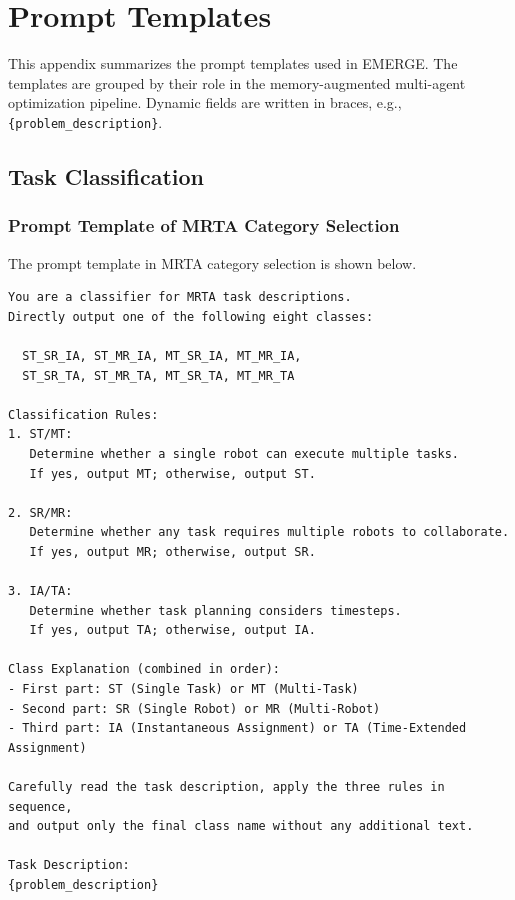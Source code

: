\documentclass[letterpaper,onecolumn,12pt]{IEEEtran}
\begin{document}
\section{Prompt Templates}


This appendix summarizes the prompt templates used in EMERGE. The templates are
grouped by their role in the memory-augmented multi-agent optimization pipeline.
Dynamic fields are written in braces, e.g., \texttt{\{problem\_description\}}.


\subsection{Task Classification}

\subsubsection{Prompt Template of MRTA Category Selection}
\label{app:prompt_selector}

The prompt template in MRTA category selection is shown below.
\begin{lstlisting}[style=promptstyle]
You are a classifier for MRTA task descriptions.
Directly output one of the following eight classes:

  ST_SR_IA, ST_MR_IA, MT_SR_IA, MT_MR_IA,
  ST_SR_TA, ST_MR_TA, MT_SR_TA, MT_MR_TA

Classification Rules:
1. ST/MT:
   Determine whether a single robot can execute multiple tasks.
   If yes, output MT; otherwise, output ST.

2. SR/MR:
   Determine whether any task requires multiple robots to collaborate.
   If yes, output MR; otherwise, output SR.

3. IA/TA:
   Determine whether task planning considers timesteps.
   If yes, output TA; otherwise, output IA.

Class Explanation (combined in order):
- First part: ST (Single Task) or MT (Multi-Task)
- Second part: SR (Single Robot) or MR (Multi-Robot)
- Third part: IA (Instantaneous Assignment) or TA (Time-Extended Assignment)

Carefully read the task description, apply the three rules in sequence,
and output only the final class name without any additional text.

Task Description:
{problem_description}
\end{lstlisting}
\end{document}
